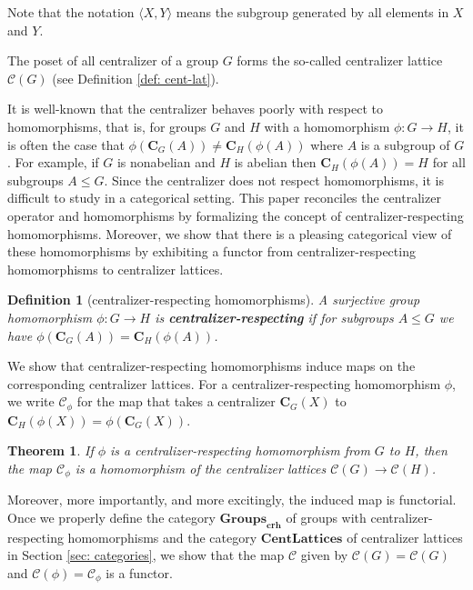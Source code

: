 \documentclass[12pt]{amsart}
\newtheorem{prevtheorem}{Theorem}
\newtheorem{definition}[theorem]{Definition}
\begin{document}
Note that the notation $\langle X,Y \rangle$ means the subgroup generated by all elements in $X$ and $Y$.

The poset of all centralizer of a group $G$ forms the so-called centralizer lattice $\mathcal{C}(G)$ (see Definition \ref{def: cent-lat}). 

It is well-known that the centralizer behaves poorly with respect to homomorphisms, that is, for groups $G$ and $H$ with a homomorphism $\phi:G\to H$, it is often the case that $\phi(\mathbf{C}_G(A)) \neq \mathbf{C}_H(\phi(A))$ where $A$ is a subgroup of $G$. For example, if $G$ is nonabelian and $H$ is abelian then $\mathbf{C}_H(\phi(A))=H$ for all subgroups $A\leq G$. Since the centralizer does not respect homomorphisms, it is difficult to study in a categorical setting. This paper reconciles the centralizer operator and homomorphisms by formalizing the concept of centralizer-respecting homomorphisms. Moreover, we show that there is a pleasing categorical view of these homomorphisms by exhibiting a functor from centralizer-respecting homomorphisms to centralizer lattices. 

\begin{definition}[centralizer-respecting homomorphisms]
    A surjective group homomorphism {$\phi:G\rightarrow H$} is \textbf{centralizer-respecting} if for  subgroups $A\leq G$ we have $\phi(\mathbf{C}_G(A)) = \mathbf{C}_H(\phi(A))$.
\end{definition}

We show that centralizer-respecting homomorphisms induce maps on the corresponding centralizer lattices.  For a centralizer-respecting homomorphism $\phi$, we write $\mathcal{C}_\phi$ for the map that takes a centralizer $\mathbf{C}_G(X)$ to $ \mathbf{C}_H(\phi(X)) = \phi(\mathbf{C}_G(X))$. 

\begin{prevtheorem}\label{prevtheorem: hom}
    If $\phi$ is a centralizer-respecting homomorphism from $G$ to $H$, then the map $\mathcal{C}_\phi$ is a homomorphism of the centralizer lattices $\mathcal{C}(G) \rightarrow \mathcal{C}(H)$. 
\end{prevtheorem}

Moreover, more importantly, and more excitingly, the induced map is functorial. Once we properly define the category $\mathbf{Groups}_{\mathbf{{crh}}}$ of groups with centralizer-respecting homomorphisms and the category $\mathbf{CentLattices}$ of centralizer lattices in Section \ref{sec: categories}, we show that the map $\mathcal{C}$ given by $\mathcal{C}(G) = \mathcal{C}(G)$ and $\mathcal{C}(\phi)=\mathcal{C}_\phi$ is a functor. 
\end{document}
